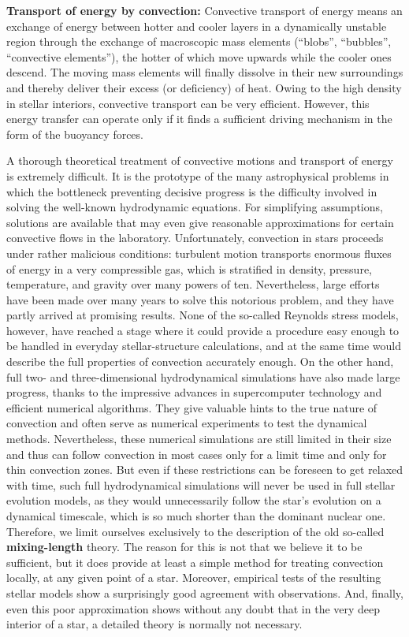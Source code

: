 \documentclass[a4paper,10pt]{article}
\begin{document}
{\noindent}\textbf{Transport of energy by convection:} Convective transport of energy means an exchange of energy between hotter and cooler layers in a dynamically unstable region through the exchange of macroscopic mass elements (``blobs'', ``bubbles'', ``convective elements''), the hotter of which move upwards while the cooler ones descend. The moving mass elements will finally dissolve in their new surroundings and thereby deliver their excess (or deficiency) of heat. Owing to the high density in stellar interiors, convective transport can be very efficient. However, this energy transfer can operate only if it finds a sufficient driving mechanism in the form of the buoyancy forces.

{\noindent}A thorough theoretical treatment of convective motions and transport of energy is extremely difficult. It is the prototype of the many astrophysical problems in which the bottleneck preventing decisive progress is the difficulty involved in solving the well-known hydrodynamic equations. For simplifying assumptions, solutions are available that may even give reasonable approximations for certain convective flows in the laboratory. Unfortunately, convection in stars proceeds under rather malicious conditions: turbulent motion transports enormous fluxes of energy in a very compressible gas, which is stratified in density, pressure, temperature, and gravity over many powers of ten. Nevertheless, large efforts have been made over many years to solve this notorious problem, and they have partly arrived at promising results. None of the so-called Reynolds stress models, however, have reached a stage where it could provide a procedure easy enough to be handled in everyday stellar-structure calculations, and at the same time would describe the full properties of convection accurately enough. On the other hand, full two- and three-dimensional hydrodynamical simulations have also made large progress, thanks to the impressive advances in supercomputer technology and efficient numerical algorithms. They give valuable hints to the true nature of convection and often serve as numerical experiments to test the dynamical methods. Nevertheless, these numerical simulations are still limited in their size and thus can follow convection in most cases only for a limit time and only for thin convection zones. But even if these restrictions can be foreseen to get relaxed with time, such full hydrodynamical simulations will never be used in full stellar evolution models, as they would unnecessarily follow the star's evolution on a dynamical timescale, which is so much shorter than the dominant nuclear one. Therefore, we limit ourselves exclusively to the description of the old so-called \textbf{mixing-length} theory. The reason for this is not that we believe it to be sufficient, but it does provide at least a simple method for treating convection locally, at any given point of a star. Moreover, empirical tests of the resulting stellar models show a surprisingly good agreement with observations. And, finally, even this poor approximation shows without any doubt that in the very deep interior of a star, a detailed theory is normally not necessary.
\end{document}

